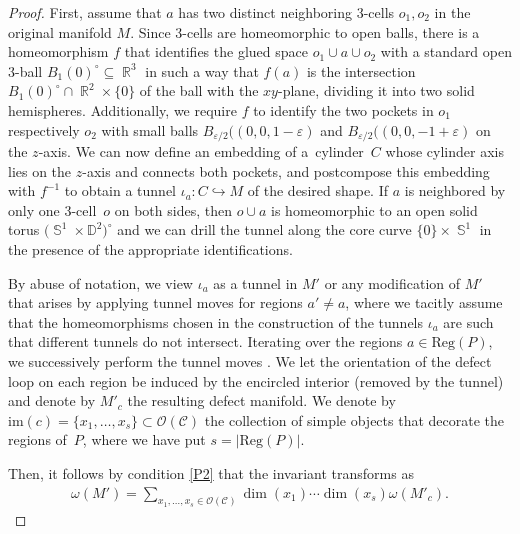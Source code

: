 \documentclass[pdftex]{sigma}
\DeclareMathOperator{\R}{\mathbb{R}}
\DeclareMathOperator{\Sp}{\mathbb{S}}
\numberwithin{equation}{section}
\theoremstyle{definition}
\begin{document}
\begin{proof}
 First, assume that $a$ has two distinct neighboring 3-cells $o_1, o_2$ in the original manifold $M$. Since 3-cells are homeomorphic to open balls, there is a homeomorphism $f$ that identifies the glued space $o_1 \cup a \cup o_2$ with a standard open 3-ball $B_1(0)^{\circ} \subseteq \R^3$ in such a way that $f(a)$ is the intersection $B_1(0)^{\circ} \cap \R^2 \times \{0\}$ of the ball with the $xy$-plane, dividing it into two solid hemispheres. Additionally, we require $f$ to identify the two pockets in $o_1$ respectively $o_2$ with small balls $B_{\varepsilon/2}((0, 0, 1-\varepsilon)$ and $B_{\varepsilon/2}((0, 0, -1+\varepsilon)$ on the $z$-axis. We can now define an embedding of a~cylinder~$C$ whose cylinder axis lies on the $z$-axis and connects both pockets, and postcompose this embedding with $f^{-1}$ to obtain a tunnel $\iota_a\colon C \hookrightarrow M$ of the desired shape. If $a$ is neighbored by only one 3-cell~$o$ on both sides, then $o \cup a$ is homeomorphic to an open solid torus $\bigl(\Sp^1 \times \mathbb{D}^2\bigr)^{\circ}$ and we can drill the tunnel along the core curve $\{0\} \times \Sp^1$ in the presence of the appropriate identifications.

 By abuse of notation, we view $\iota_a$ as a tunnel in $M'$ or any modification of $M'$ that arises by applying tunnel moves for regions $a' \neq a$, where we tacitly assume that the homeomorphisms chosen in the construction of the tunnels $\iota_a$ are such that different tunnels do not intersect. Iterating over the regions $a \in \mathrm{Reg}(P)$, we successively perform the tunnel moves . We let the orientation of the defect loop on each region be induced by the encircled interior (removed by the tunnel) and denote by $M'_c$ the resulting defect manifold. We denote by $\mathrm{im}(c) = \{x_1, \dots, x_{s}\} \subset \mathcal{O}({\mathcal{C}})$ the collection of simple objects that decorate the regions of~$P$, where we have put $s = |\mathrm{Reg}(P)|$.

 Then, it follows by condition \ref{P2} that the invariant transforms as
 \begin{align}
 \label{eqT2}
 \omega(M') = \sum_{x_1, \dots, x_{s} \in \mathcal{O}({\mathcal{C}})} \dim(x_1) \cdots \dim(x_{s}) \omega (M'_c ).
 \end{align}


\end{proof}
\end{document}

